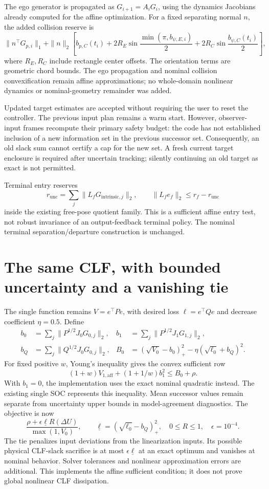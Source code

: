 \documentclass[11pt]{article}
\begin{document}
The ego generator is propagated as $G_{i+1}=A_iG_i$, using the dynamics
Jacobians already computed for the affine optimization. For a fixed
separating normal $n$, the added collision reserve is
\[
 \|n^\top G_{p,i}\|_1+\|n\|_2
 \left[b_{p,C}(t_i)+2R_E\sin\frac{\min(\pi,b_{\psi,E,i})}{2}
                     +2R_C\sin\frac{b_{\psi,C}(t_i)}{2}\right],
\]
where $R_E,R_C$ include rectangle center offsets. The orientation terms are
geometric chord bounds. The ego propagation and nominal collision
convexification remain affine approximations; no whole-domain nonlinear
dynamics or nominal-geometry remainder was added.

Updated target estimates are accepted without requiring the user to reset
the controller. The previous input plan remains a warm start. However,
observer-input frames recompute their primary safety budget: the code has
not established inclusion of a new information set in the previous
successor set. Consequently, an old slack sum cannot certify a cap for the
new set. A fresh current target enclosure is required after uncertain tracking;
silently continuing an old target as exact is not permitted.

Terminal entry reserves
\[
 r_{\mathrm{unc}}=\sum_j\|L_fG_{\mathrm{intrinsic},j}\|_2,
 \qquad \|L_fe_f\|_2\le r_f-r_{\mathrm{unc}}
\]
inside the existing free-pose quotient family. This is a sufficient affine
entry test, not robust invariance of an output-feedback terminal policy.
The nominal terminal separation/departure construction is unchanged.

\section{The same CLF, with bounded uncertainty and a vanishing tie}
The single function remains $V=e^\top Pe$, with desired loss
$\ell=e^\top Qe$ and decrease coefficient $\eta=0.5$. Define
\begin{align*}
 b_0&=\sum_j\|P^{1/2}J_0G_{0,j}\|_2,&
 b_1&=\sum_j\|P^{1/2}J_1G_{1,j}\|_2,\\
 b_Q&=\sum_j\|Q^{1/2}J_0G_{0,j}\|_2,&
 B_0&=(\sqrt{V_0}-b_0)_+^2-\eta(\sqrt{\ell_0}+b_Q)^2.
\end{align*}
For fixed positive $w$, Young's inequality gives the convex sufficient row
\[
 (1+w)V_{1,\mathrm{aff}}+(1+1/w)b_1^2\le B_0+\rho.
\]
With $b_1=0$, the implementation uses the exact nominal quadratic instead.
The existing single SOC represents this inequality. Mean successor values
remain separate from uncertainty upper bounds in model-agreement diagnostics.
The objective is now
\[
 \frac{\rho+\epsilon\underline\ell R(\Delta U)}{\max(1,V_0)},\qquad
 \underline\ell=(\sqrt{\ell_0}-b_Q)_+^2,\quad 0\le R\le1,
 \quad \epsilon=10^{-4}.
\]
The tie penalizes input deviations from the linearization inputs. Its possible
physical CLF-slack sacrifice is at most $\epsilon\underline\ell$ at an exact
optimum and vanishes at nominal behavior. Solver tolerances and nonlinear
approximation errors are additional. This implements the affine sufficient
condition; it does not prove global nonlinear CLF dissipation.
\end{document}
